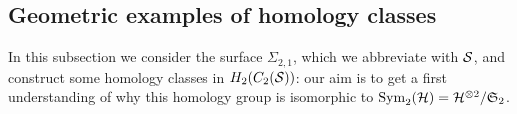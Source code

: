 \subsection{Geometric examples of homology classes}
In this subsection we consider the surface $\Sigma_{2,1}$, which we abbreviate with $\S$, and
construct some homology classes in $H_2(C_2(\S))$: our aim is to get a first understanding
of why this homology group is isomorphic to $\Sym_2(\H)=\H^{\otimes 2}/\mathfrak{S}_2$.
